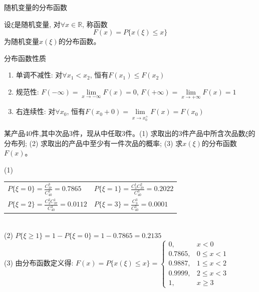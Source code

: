 \begin{frame}{随机变量的分布函数}
\begin{definition}
	设$\xi$是随机变量, 对$\forall x\in\mathbb{R}$, 称函数
	\[F(x)=P\{x(\xi)\le x\}\]
	为随机变量$x(\xi)$的分布函数。
\end{definition}
\begin{block}{分布函数性质}
\begin{enumerate}
	\item 单调不减性: 对$\forall x_1<x_2$, 恒有$F(x_1)\le F(x_2)$
	\item 规范性: $F(-\infty)=\lim\limits_{x\to -\infty}F(x)=0$, $F(+\infty)=\lim\limits_{x\to +\infty}F(x)=1$
	\item 右连续性: 对$\forall x_0$, 恒有$F(x_0+0)=\lim\limits_{x\to x_0^+}F(x)=F(x_0)$
\end{enumerate}
\end{block}
\end{frame}

\begin{frame}
\begin{example}
	某产品40件,其中次品3件，现从中任取3件。(1) 求取出的3件产品中所含次品数$\xi$的分布列; (2) 求取出的产品中至少有一件次品的概率; (3) 求$x(\xi)$的分布函数$F(x)$。
	\begin{block}{}
		(1) \begin{tabular}{ll}
			$P\{\xi=0\}=\frac{C_{37}^{3}}{C_{40}^{3}}=0.7865$ & $P\{\xi=1\}=\frac{C_{3}^{1}C_{37}^{2}}{C_{40}^{3}}=0.2022$ \\ 
			$P\{\xi=2\}=\frac{C_{3}^{2}C_{37}^{1}}{C_{40}^{3}}=0.0112$ & $P\{\xi=3\}=\frac{C_{3}^{3}}{C_{40}^{3}}=0.0001$ \\ 
		\end{tabular}\\ 
	   (2) $P\{\xi\ge 1\}=1-P\{\xi=0\}=1-0.7865=0.2135$\\
	   (3) 由分布函数定义得:
	   $F(x)=P\{x(\xi)\le x\} =
	   \begin{cases}
	   	0,      & x<0 \\
	   	0.7865, & 0\le x<1 \\
	   	0.9887, & 1\le x<2 \\
	   	0.9999, & 2\le x<3 \\
	   	1,      & x\ge 3
	   \end{cases} $
	\end{block}
\end{example}
\end{frame}

